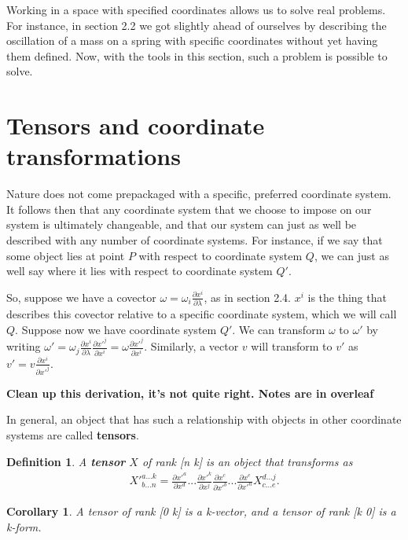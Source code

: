\documentclass{book}
\newtheorem{defn}[equation]{Definition}
\newtheorem{coro}[equation]{Corollary}
\begin{document}
Working in a space with specified coordinates allows us to solve real problems. For instance, in section 2.2 we got slightly ahead of ourselves by describing the oscillation of a mass on a spring with specific coordinates without yet having them defined. Now, with the tools in this section, such a problem is possible to solve.  



\section{Tensors and coordinate transformations}


Nature does not come prepackaged with a specific, preferred coordinate system. It follows then that any coordinate system that we choose to impose on our system is ultimately changeable, and that our system can just as well be described with any number of coordinate systems. For instance, if we say that some object lies at point $P$ with respect to coordinate system $Q$, we can just as well say where it lies with respect to coordinate system $Q'$. 

So, suppose we have a covector $\omega = \omega_i \frac{\partial x^i}{\partial \lambda}$, as in section 2.4. $x^i$ is the thing that describes this covector relative to a specific coordinate system, which we will call $Q$. Suppose now we have coordinate system $Q'$. We can transform $\omega$ to $\omega'$ by writing $\omega' = \omega_j \frac{\partial x^i}{\partial \lambda} \frac{\partial x'^j}{\partial x^i} = \omega \frac{\partial x'^j}{\partial x^i}$. Similarly, a vector $v$ will transform to $v'$ as $v' = v \frac{\partial x^i}{\partial x'^j}$. 

\textbf{Clean up this derivation, it's not quite right. Notes are in overleaf}

In general, an object that has such a relationship with objects in other coordinate systems are called \textbf{tensors}. 



\begin{defn}
	A \textbf{tensor} $X$ of rank [n k] is an object that transforms as \begin{gather}X'^{a...k}_{b...n} = \frac{\partial x'^a}{\partial x^d} ... \frac{\partial x'^k}{\partial x^j} \frac{\partial x^c}{\partial x'^b} ... \frac{\partial x^e}{\partial x'^n} X^{d...j}_{c...e}.\end{gather} 
\end{defn}

\begin{coro}
	A tensor of rank [0 k] is a k-vector, and a tensor of rank [k 0] is a k-form. 
\end{coro}
\end{document}

